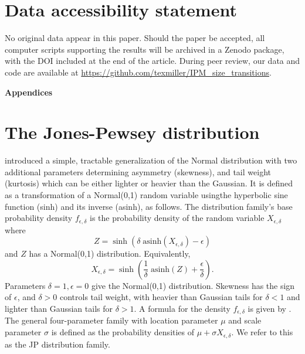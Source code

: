 \documentclass[12pt]{article}
\newcounter{box}
\newcommand{\be}{\begin{equation}}
\newcommand{\ee}{\end{equation}}
\begin{document}
\section{Data accessibility statement}
No original data appear in this paper. Should the paper be accepted, all computer scripts supporting the results will be archived in a Zenodo package, with the DOI included at the end of the article. 
During peer review, our data and code are available at \url{https://github.com/texmiller/IPM_size_transitions}. 
	
\newpage 

%



\newpage 
\clearpage 
\setcounter{equation}{0}
\setcounter{figure}{0}
\setcounter{section}{0}
\setcounter{table}{0}
\setcounter{Box}{0}
\renewcommand{\theequation}{S.\arabic{equation}}
\renewcommand{\thetable}{S-\arabic{table}}
\renewcommand{\thefigure}{S-\arabic{figure}}
\renewcommand{\theBox}{S-\arabic{Box}}
\renewcommand{\thesection}{S.\arabic{section}}

\centerline{\Large{\textbf{Appendices}}}

\section{The Jones-Pewsey distribution} 
\citet{jones-pewsey-2009} introduced a simple, tractable generalization of the Normal distribution with two additional parameters determining  
asymmetry (skewness), and tail weight (kurtosis) which can be either lighter or heavier than the Gaussian. It is defined as a transformation
of a Normal(0,1) random variable usingthe hyperbolic sine function (sinh) and its inverse (asinh), as follows. The distribution family's base probability density  
$f_{\epsilon,\delta}$  is the probability density of the random variable $X_{\epsilon,\delta}$ where  
\be
Z = \sinh (\delta \; \mbox{asinh}(X_{\epsilon,\delta}) - \epsilon)
\label{eqn:JP1}
\ee
and $Z$ has a Normal(0,1) distribution.  Equivalently, 
\be
X_{\epsilon,\delta} = \sinh \left( \frac{1}{\delta} \; \mbox{asinh}(Z) + \frac{\epsilon}{\delta}\right).
\label{eqn:JP2}
\ee
Parameters $\delta=1, \epsilon=0$ give the Normal(0,1) distribution. Skewness has the sign of $\epsilon$, and
$\delta > 0$ controls tail weight, with heavier than Gaussian tails for $\delta<1$ and lighter than Gaussian tails for $\delta > 1$. 
A formula for the density $f_{\epsilon,\delta}$ is given by \citet[][eqn. 2]{jones-pewsey-2009}. 
The general four-parameter family with location parameter $\mu$ and scale parameter $\sigma$ is defined as the probability densities 
of $\mu + \sigma X_{\epsilon, \delta}$. We refer to this as the JP distribution family. 
\end{document}
